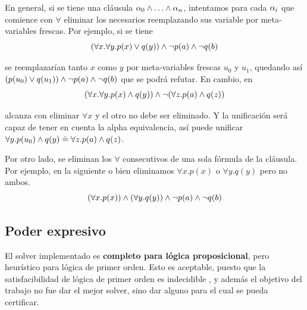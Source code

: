 En general, si se tiene una cláusula 
\(
    \anyForm_0 \fAnd \dots \fAnd \anyForm_n
\), intentamos para cada $\alpha_i$ que comience con $\forall$ eliminar los necesarios reemplazando sus variable por meta-variables frescas. Por ejemplo,  si se tiene
\[
    (\forall x. \forall y . p(x) \vee q(y)) \wedge \neg p(a) \wedge \neg q(b)
\]

se reemplazarían tanto $x$ como $y$ por meta-variables frescas $u_0$ y $u_1$, quedando así $(p(u_0) \vee q(u_1)) \wedge \neg p(a) \wedge \neg q(b)$ que se podrá refutar. En cambio, en
\[
    (\forall x. \forall y . p(x) \wedge q(y)) \wedge \neg (\forall z. p(a) \wedge q(z))
\]

alcanza con eliminar $\forall x$ y el otro no debe ser eliminado. Y la unificación será capaz de tener en cuenta la alpha equivalencia, así puede unificar $\forall y . p(u_0) \wedge q(y) \doteq \forall z. p(a) \wedge q(z)$.

Por otro lado, se eliminan los $\forall$ consecutivos de una sola fórmula de la cláusula. Por ejemplo, en la siguiente o bien eliminamos $\forall x . p(x)$ o $\forall y . q(y)$ pero no ambos.
\[
    (\forall x . p(x)) \wedge (\forall y . q(y)) \wedge \neg p(a) \wedge \neg q(b)
\]

\subsection{Poder expresivo}


El solver implementado es \textbf{completo para lógica proposicional}, pero heurístico para lógica de primer orden. Esto es aceptable, puesto que la satisfacibilidad de lógica de primer orden es indecidible , y además el objetivo del trabajo no fue dar el mejor solver, sino dar alguno para el cual se pueda certificar.


